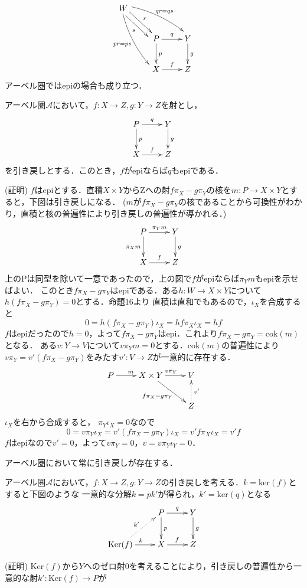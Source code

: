 \[
\xymatrix
{
W \ar@/^/@<1ex>[rrd]^{qr=qs} \ar@/_/@<-0.5ex>[rdd]_{pr=ps}  \ar@<0.5ex>[rd]^r\ar@<-1ex>[rd]_s\\
&	P \ar[d]^{p} \ar[r]^{q} 	& Y \ar[d]^g\\
&	X \ar[r]^{f}			& Z
}
\]
\proofend
アーベル圏ではepiの場合も成り立つ．
\begin{prop}
アーベル圏$\mathcal{A}$において，$f:X \to Z, g:Y \to Z$を射とし，
\[
\xymatrix
{
P \ar[r]^{q} \ar[d]^{p} 	& Y \ar[d]^g\\
X \ar[r]^{f}			& Z
}
\]
を引き戻しとする．このとき，$f$がepiならば$q$もepiである．
\end{prop}
(証明)
$f$はepiとする．直積$X \times Y$からZへの射$ f \pi_X - g  \pi_Y$の核を$m:P \to X \times Y$とすると，下図は引き戻しになる．
($m$が$f \pi_X - g  \pi_Y$の核であることから可換性がわかり，直積と核の普遍性により引き戻しの普遍性が導かれる．)
\[
\xymatrix
{
P \ar[r]^{\pi_Y m} \ar[d]_{\pi_X m} 	& Y \ar[d]^g\\
X \ar[r]^{f}			& Z
}
\]
上のPは同型を除いて一意であったので，上の図で$f$がepiならば$\pi_Y m$もepiを示せばよい．
このとき$f \pi_X - g  \pi_Y$はepiである．ある$h:W \to X \times Y$について$h(f \pi_X - g  \pi_Y) = 0$とする．命題16より
直積は直和でもあるので，$\iota_X$を合成すると
\[
	0 = h(f \pi_X - g  \pi_Y)\iota_X = hf \pi_X \iota_X =hf
\]
$f$はepiだったので$h=0$，よって$f \pi_X - g  \pi_Y$はepi．これより$f \pi_X - g  \pi_Y = \mathrm{cok}(m)$となる．
ある$v : Y \to V$について$v \pi_Y m=0$とする．$\mathrm{cok}(m)$の普遍性により
$v\pi_Y = v'(f \pi_X - g  \pi_Y)$をみたす$v' :V \to Z$が一意的に存在する．
\[
\xymatrix
{
P\ar[r]^m &X \times Y \ar[rd]_{f \pi_X - g  \pi_Y} \ar[r]^{v\pi_Y} & V \\
&&Z  \ar@{.>}[u]_{v'}
}
\]
$\iota_X$を右から合成すると，
$\pi_Y\iota_X=0$なので
\[
	0 = v\pi_Y\iota_X = v'(f \pi_X - g  \pi_Y)\iota_X = v'f\pi_X\iota_X =v'f
\]
$f$はepiなので$v'=0$，よって$v\pi_Y = 0$，$v= v\pi_Y\iota_Y=0$．
\proofend
\begin{cor}
アーベル圏において常に引き戻しが存在する．
\end{cor}
\proofend
\begin{prop}
アーベル圏$\mathcal{A}$において，$f:X \to Z, g:Y \to Z$の引き戻しを考える．$k=\mathrm{ker}(f)$とすると下図のような
一意的な分解$k = pk'$が得られ，$k'=\mathrm{ker}(q)$となる
\[
\xymatrix
{
								&P \ar[r]^{q} \ar[d]^{p} 	& Y \ar[d]^g\\
\mathrm{Ker}(f)\ar[r]^k \ar@{.>}[ru]^{k'}	&X \ar[r]^{f}			& Z
}
\]
\end{prop}
(証明)
$\mathrm{Ker}(f)$から$Y$へのゼロ射$0$を考えることにより，引き戻しの普遍性から一意的な射$k':\mathrm{Ker}(f)\to P$が
